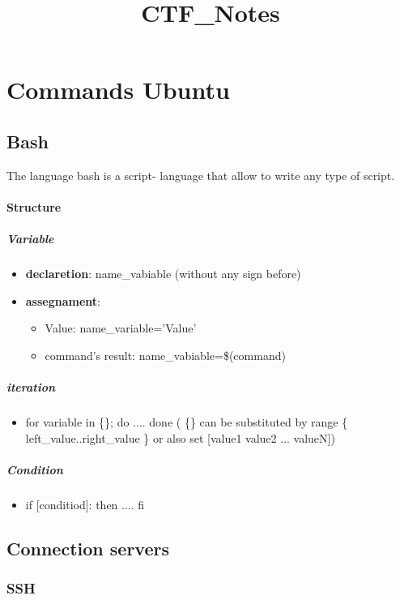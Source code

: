 \documentclass{article}
\title{CTF\_Notes}
\begin{document}
\tableofcontents



\section{Commands Ubuntu}
    \subsection{Bash}
            The language bash is a script- language that allow to write any type of script. 
            \paragraph{Structure}
                \subparagraph{Variable}
                    \begin{itemize}
                        \item \textbf{declaretion}: name\_vabiable (without any sign before)
                        \item \textbf{assegnament}: 
                                \begin{itemize}
                                    \item Value: name\_variable='Value'
                                    \item command's result: name\_vabiable=\$(command)
                                \end{itemize} 
                    \end{itemize}
                   
                \subparagraph{iteration}
                    \begin{itemize}
                        \item for variable in \{\}; do .... done ( \{\} can be substituted by range  \{ left\_value..right\_value  \} or also set [value1 value2 ... valueN])
                    \end{itemize}
                \subparagraph{Condition}
                    \begin{itemize}
                        \item if [conditiod]: then .... fi
                    \end{itemize}
    \subsection{Connection servers}
                \subsubsection{SSH}
\end{document}
